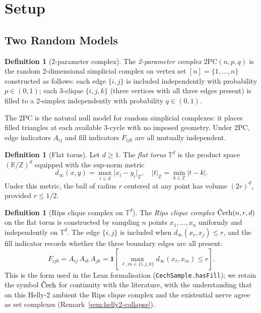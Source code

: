 \documentclass[reqno,12pt]{amsart}
\newcommand{\PC}{\mathrm{2PC}}
\newcommand{\Cech}{\ifmmode\text{\v{C}ech}\else\v{C}ech\fi}  %
\newcommand{\TT}{\mathbb{T}}         %
\newcommand{\RR}{\mathbb{R}}
\newcommand{\ZZ}{\mathbb{Z}}
\newcommand{\lean}[1]{\textup{\texttt{\small #1}}}
\theoremstyle{plain}
\theoremstyle{definition}
\newtheorem{definition}[theorem]{Definition}
\theoremstyle{remark}
\begin{document}
\section{Setup}\label{sec:setup}\label{sec:models}

\subsection{Two Random Models}

\begin{definition}[2-parameter complex]\label{def:twopc}
The \emph{2-parameter complex} $\PC(n,p,q)$ is the random 2-dimensional simplicial complex
on vertex set $[n] = \{1,\ldots,n\}$ constructed as follows: each edge $\{i,j\}$ is included
independently with probability $p\in(0,1)$; each 3-clique $\{i,j,k\}$ (three vertices with
all three edges present) is filled to a 2-simplex independently with probability $q\in(0,1)$.
\end{definition}

The 2PC is the natural null model for random simplicial complexes: it places filled triangles
at each available 3-cycle with no imposed geometry. Under $\PC$, edge indicators $A_{ij}$
and fill indicators $F_{ijk}$ are all mutually independent.

\begin{definition}[Flat torus]\label{def:torus}
Let $d\geq 1$. The \emph{flat torus} $\TT^d$ is the product space $(\RR/\ZZ)^d$ equipped
with the sup-norm metric
\[
  d_\infty(x,y) = \max_{i\leq d}\lvert x_i - y_i\rvert_\ZZ,
  \quad \lvert t\rvert_\ZZ = \min_{k\in\ZZ}\lvert t - k\rvert.
\]
Under this metric, the ball of radius $r$ centered at any point has volume $(2r)^d$,
provided $r \leq 1/2$.
\end{definition}

\begin{definition}[Rips clique complex on $\TT^d$]\label{def:cech}
The \emph{Rips clique complex} $\Cech(n,r,d)$ on the flat torus is constructed by
sampling $n$ points $x_1,\ldots,x_n$ uniformly and independently on $\TT^d$. The edge
$\{i,j\}$ is included when $d_\infty(x_i,x_j)\leq r$, and the fill indicator records
whether the three boundary edges are all present:
\begin{equation}\label{eq:fill-clique}
  F_{ijk} = A_{ij}\, A_{ik}\, A_{jk}
         = \mathbf{1}\!\left[\max_{\ell, m \in \{i,j,k\}} d_\infty(x_\ell, x_m) \le r\right].
\end{equation}
This is the form used in the Lean formalisation (\lean{CechSample.hasFill}); we retain
the symbol $\Cech$ for continuity with the literature, with the understanding that on
this Helly-2 ambient the Rips clique complex and the existential nerve agree as
set complexes (Remark~\ref{rem:helly2-collapse}).
\end{definition}
\end{document}
